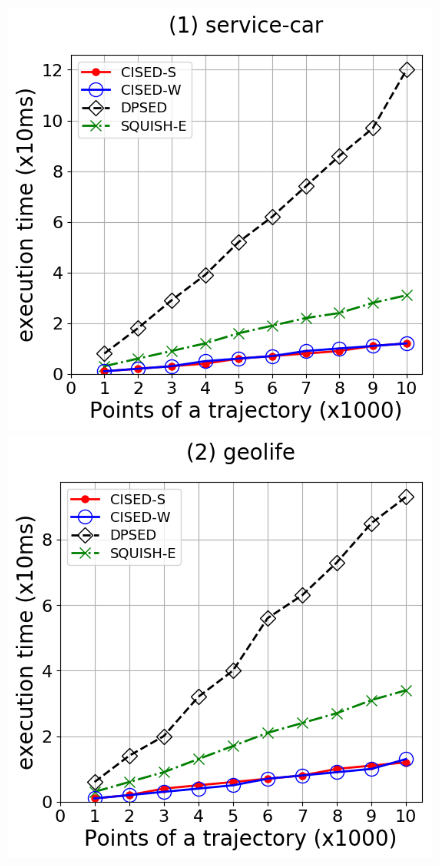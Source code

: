 \begin{figure}[tb!]
\centering
\includegraphics[scale = 0.30]{Figures/Exp-time-size-service.png}
\includegraphics[scale = 0.30]{Figures/Exp-time-size-geolife.png}

\end{figure}
